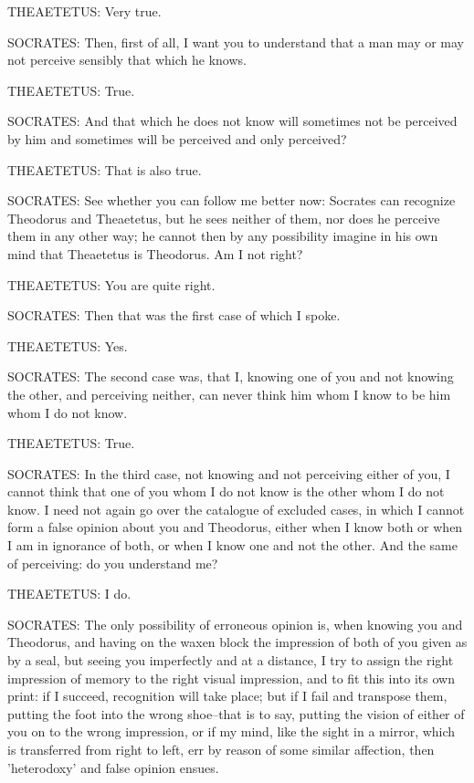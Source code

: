 THEAETETUS: Very true.

SOCRATES: Then, first of all, I want you to understand that a man may or
may not perceive sensibly that which he knows.

THEAETETUS: True.

SOCRATES: And that which he does not know will sometimes not be
perceived by him and sometimes will be perceived and only perceived?

THEAETETUS: That is also true.

SOCRATES: See whether you can follow me better now: Socrates can
recognize Theodorus and Theaetetus, but he sees neither of them,
nor does he perceive them in any other way; he cannot then by any
possibility imagine in his own mind that Theaetetus is Theodorus. Am I
not right?

THEAETETUS: You are quite right.

SOCRATES: Then that was the first case of which I spoke.

THEAETETUS: Yes.

SOCRATES: The second case was, that I, knowing one of you and not
knowing the other, and perceiving neither, can never think him whom I
know to be him whom I do not know.

THEAETETUS: True.

SOCRATES: In the third case, not knowing and not perceiving either of
you, I cannot think that one of you whom I do not know is the other whom
I do not know. I need not again go over the catalogue of excluded cases,
in which I cannot form a false opinion about you and Theodorus, either
when I know both or when I am in ignorance of both, or when I know one
and not the other. And the same of perceiving: do you understand me?

THEAETETUS: I do.

SOCRATES: The only possibility of erroneous opinion is, when knowing you
and Theodorus, and having on the waxen block the impression of both of
you given as by a seal, but seeing you imperfectly and at a distance,
I try to assign the right impression of memory to the right visual
impression, and to fit this into its own print: if I succeed,
recognition will take place; but if I fail and transpose them, putting
the foot into the wrong shoe--that is to say, putting the vision of
either of you on to the wrong impression, or if my mind, like the sight
in a mirror, which is transferred from right to left, err by reason of
some similar affection, then 'heterodoxy' and false opinion ensues.

